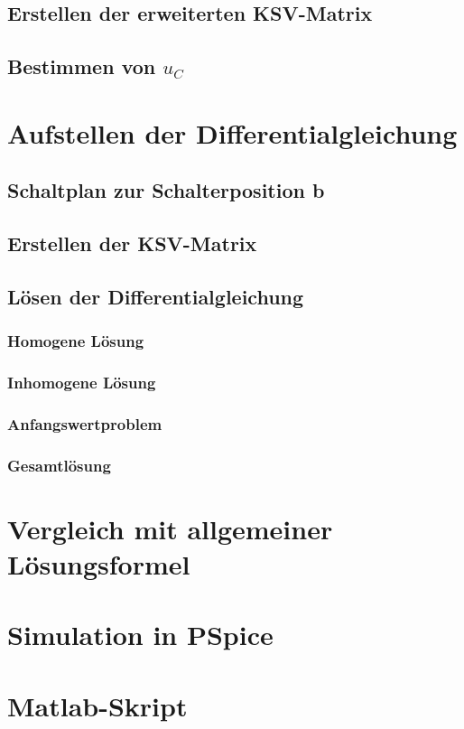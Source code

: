 \documentclass[11pt]{scrartcl}
\begin{document}
\subsection{Erstellen der erweiterten KSV-Matrix}
\subsection{Bestimmen von $u_C$}
\section{Aufstellen der Differentialgleichung}
\subsection{Schaltplan zur Schalterposition b}
\subsection{Erstellen der KSV-Matrix}
\subsection{Lösen der Differentialgleichung}
\subsubsection{Homogene Lösung}
\subsubsection{Inhomogene Lösung}
\subsubsection{Anfangswertproblem}
\subsubsection{Gesamtlösung}
\section{Vergleich mit allgemeiner Lösungsformel}
\section{Simulation in PSpice}
\section{Matlab-Skript}
\end{document}
